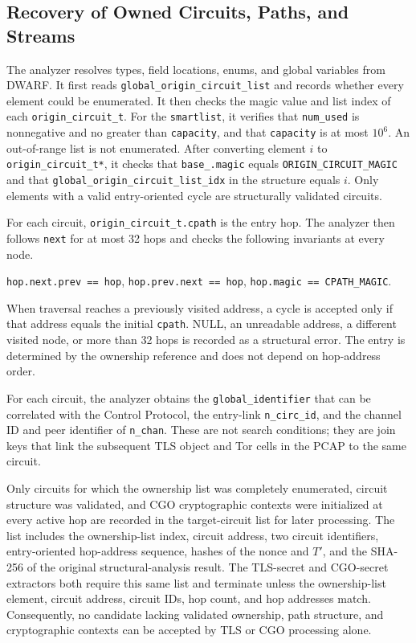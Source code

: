 \documentclass[10pt,a4paper]{article}
\newcommand{\code}[1]{\nolinkurl{#1}}
\begin{document}
\subsection{Recovery of Owned Circuits, Paths, and Streams}

The analyzer resolves types, field locations, enums, and global variables from DWARF.
It first reads \code{global_origin_circuit_list} and records whether every element could be enumerated. It then checks the magic value and list index of each \code{origin_circuit_t}.
For the \code{smartlist}, it verifies that \code{num_used} is nonnegative and no greater than \code{capacity}, and that \code{capacity} is at most $10^6$. An out-of-range list is not enumerated. After converting element $i$ to \code{origin_circuit_t*}, it checks that \code{base_.magic} equals \code{ORIGIN_CIRCUIT_MAGIC} and that \code{global_origin_circuit_list_idx} in the structure equals $i$. Only elements with a valid entry-oriented cycle are structurally validated circuits.

For each circuit, \code{origin_circuit_t.cpath} is the entry hop.
The analyzer then follows \code{next} for at most 32 hops and checks the following invariants at every node.

\begin{center}
\code{hop.next.prev == hop},\quad
\code{hop.prev.next == hop},\quad
\code{hop.magic == CPATH_MAGIC}.
\end{center}

When traversal reaches a previously visited address, a cycle is accepted only if that address equals the initial \code{cpath}. NULL, an unreadable address, a different visited node, or more than 32 hops is recorded as a structural error.
The entry is determined by the ownership reference and does not depend on hop-address order.

For each circuit, the analyzer obtains the \code{global_identifier} that can be correlated with the Control Protocol, the entry-link \code{n_circ_id}, and the channel ID and peer identifier of \code{n_chan}. These are not search conditions; they are join keys that link the subsequent TLS object and Tor cells in the PCAP to the same circuit.

Only circuits for which the ownership list was completely enumerated, circuit structure was validated, and CGO cryptographic contexts were initialized at every active hop are recorded in the target-circuit list for later processing. The list includes the ownership-list index, circuit address, two circuit identifiers, entry-oriented hop-address sequence, hashes of the nonce and $T'$, and the SHA-256 of the original structural-analysis result. The TLS-secret and CGO-secret extractors both require this same list and terminate unless the ownership-list element, circuit address, circuit IDs, hop count, and hop addresses match. Consequently, no candidate lacking validated ownership, path structure, and cryptographic contexts can be accepted by TLS or CGO processing alone.
\end{document}
